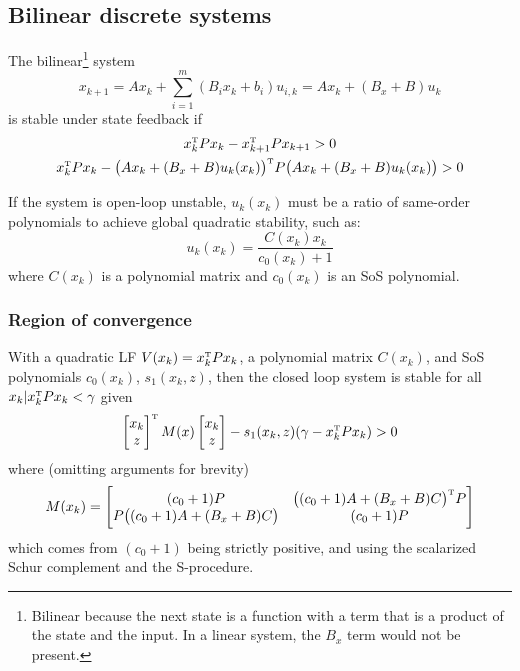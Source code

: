 \subsection{Bilinear discrete systems}
The bilinear\footnote{Bilinear because the next state is a function with a term that is a product of the state and the input. In a linear system, the $B_x$ term would not be present.} system
%
\begin{equation}
  x_{k+1} = A x_k + \sum_{i=1}^m (B_i x_k + b_i) u_{i,k} = A x_k + (B_x + B) u_k
\end{equation}
%
is stable under state feedback if
%
\begin{gather}
  x_k\tp P x_k - x_{k+1}\tp P x_{k+1} > 0 \\
  x_k\tp P x_k
  -
  \big(
    A x_k + (B_x + B) u_k(x_k)
  \big)\tp
  P
  \big(
    A x_k + (B_x + B) u_k(x_k)
  \big)
  > 0
\end{gather}

If the system is open-loop unstable, $u_k(x_k)$ must be a ratio of same-order polynomials to achieve global quadratic stability, such as:
%
\begin{equation}
  u_k(x_k) = \frac{C(x_k) x_k}{c_0(x_k) + 1}
\end{equation}
%
where $C(x_k)$ is a polynomial matrix and $c_0(x_k)$ is an SoS polynomial.

\subsubsection{Region of convergence}
With a quadratic LF $V(x_k) = x_k\tp P x_k$, a polynomial matrix $C(x_k)$, and SoS polynomials $c_0(x_k)$, $s_1(x_k,z)$, then the closed loop system is stable for all $x_k | x_k\tp P x_k < \gamma$ given
%
\begin{equation}
  \bmat{x_k \\ z}\tp
  M(x)
  \bmat{x_k \\ z}
  -
  s_1(x_k,z) (\gamma - x_k\tp P x_k) > 0
\end{equation}
%
where (omitting arguments for brevity)
%
\begin{equation}\label{eq:polynomial-matrix-convergence}
  M(x_k) =
  \begin{bmatrix}
    (c_0 + 1) P & \big( (c_0 + 1)A + (B_x + B)C \big)\tp P \\
    P \big( (c_0 + 1)A + (B_x + B)C \big) & (c_0 + 1)P
  \end{bmatrix}
\end{equation}
%
which comes from $(c_0 + 1)$ being strictly positive, and using the scalarized Schur complement and the S-procedure.

